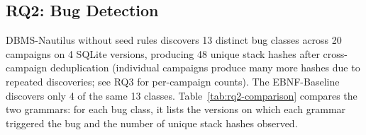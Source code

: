 \vspace{0.5em}
\noindent{}
\vspace{0.5em}


\subsection{RQ2: Bug Detection}
\label{sec:rq2-results}

DBMS-Nautilus without seed rules discovers 13 distinct bug classes across 20 campaigns on 4 SQLite versions, producing 48 unique stack hashes after cross-campaign deduplication (individual campaigns produce many more hashes due to repeated discoveries; see RQ3 for per-campaign counts). The EBNF-Baseline discovers only 4 of the same 13 classes. Table~\ref{tab:rq2-comparison} compares the two grammars: for each bug class, it lists the versions on which each grammar triggered the bug and the number of unique stack hashes observed.

